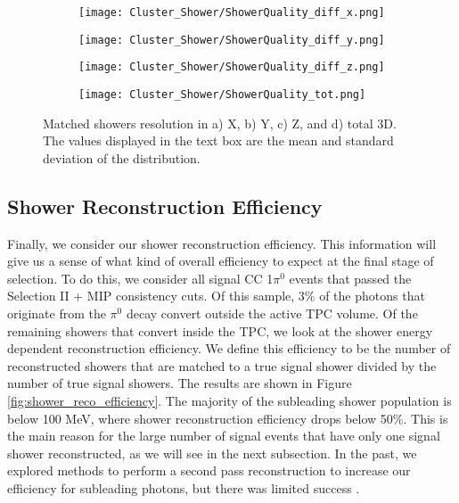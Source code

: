 \begin{figure}[h!]
\centering
  \begin{subfigure}[t]{0.45\textwidth}
    \centering
\texttt{[image: Cluster\_Shower/ShowerQuality\_diff\_x.png]}
  \caption{ }
  \end{subfigure} 
  \hspace{5mm}
  \begin{subfigure}[t]{0.45\textwidth}
    \centering
\texttt{[image: Cluster\_Shower/ShowerQuality\_diff\_y.png]}
  \caption{ }
  \end{subfigure} 
  \hspace{5mm}
  \begin{subfigure}[t]{0.45\textwidth}
    \centering
\texttt{[image: Cluster\_Shower/ShowerQuality\_diff\_z.png]}
  \caption{ }
  \end{subfigure} 
  \hspace{5mm}
  \begin{subfigure}[t]{0.45\textwidth}
    \centering
\texttt{[image: Cluster\_Shower/ShowerQuality\_tot.png]}
  \caption{ }
  \end{subfigure} 
\caption{ Matched showers resolution in a) X, b) Y, c) Z, and d) total 3D. The values displayed in the text box are the mean and standard deviation of the distribution. }
\label{fig:showerquality_xyzres}
\end{figure}

\clearpage
\subsection{Shower Reconstruction Efficiency}
Finally, we consider our shower reconstruction efficiency. This information will give us a sense of what kind of overall efficiency to expect at the final stage of selection. To do this, we consider all signal CC 1$\pi^0$ events that passed the Selection II + MIP consistency cuts. Of this sample, 3\% of the photons that originate from the $\pi^0$ decay convert outside the active TPC volume. Of the remaining showers that convert inside the TPC, we look at the shower energy dependent reconstruction efficiency. We define this efficiency to be the number of reconstructed showers that are matched to a true signal shower divided by the number of true signal showers. The results are shown in Figure \ref{fig:shower_reco_efficiency}.  The majority of the subleading shower population is below 100 MeV, where shower reconstruction efficiency drops below 50\%.  This is the main reason for the large number of signal events that have only one signal shower reconstructed, as we will see in the next subsection. In the past, we explored methods to perform a second pass reconstruction to increase our efficiency for subleading photons, but there was limited success \cite{bib:jz_catch_subleading}.  

